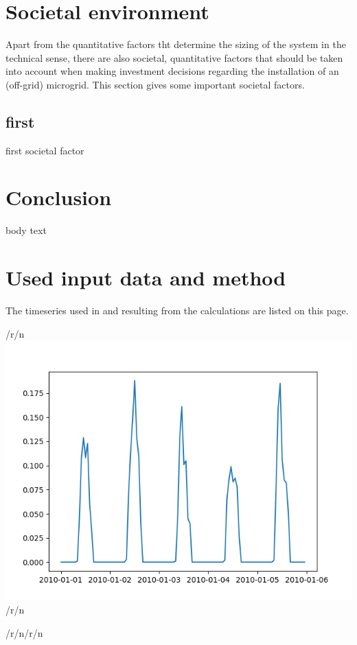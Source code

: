 \documentclass{article}
\begin{document}
\begin{multicols*}{2}
\section*{Societal environment}

Apart from the quantitative factors tht determine the sizing of the system in the technical sense, there are also societal, quantitative factors that should be taken into account when making investment decisions regarding the installation of an (off-grid) microgrid. This section gives some important societal factors.

\subsection{first}

first societal factor

\section*{Conclusion}

body text

\newpage 

\appendix

\section*{Used input data and method}

The timeseries used in and resulting from the calculations are listed on this page.

\begin{center}/r/n\includegraphics[width=\linewidth]{per_unit_pv_generation.png}/r/n\end{center}/r/n/r/n




\end{multicols*}
\end{document}
